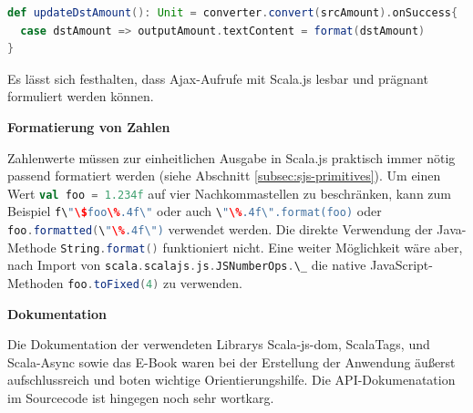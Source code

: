 \documentclass[a4paper, 12pt, hidelinks, listof=totoc, listoftables=totoc, bibliography=totoc]{scrreprt}
\newcommand{\scala}[1]{\lstinline[language=Scala, style=inline]|#1|}
\newcommand{\MyMiniSec}[1]{\rmfamily\fontsize{12}{15}\selectfont
	\vspace{7pt}\textbf{#1} %
}
\begin{document}
\begin{lstlisting}[language=Scala, style=snippet]
def updateDstAmount(): Unit = converter.convert(srcAmount).onSuccess{
  case dstAmount => outputAmount.textContent = format(dstAmount)
}
\end{lstlisting}

Es lässt sich festhalten, dass Ajax-Aufrufe mit Scala.js lesbar und prägnant formuliert werden können.


\MyMiniSec{Formatierung von Zahlen}

Zahlenwerte müssen zur einheitlichen Ausgabe in Scala.js praktisch immer nötig passend formatiert werden (siehe Abschnitt \ref{subsec:sjs-primitives}). Um einen Wert \scala{val foo = 1.234f} auf vier Nachkommastellen zu beschränken, kann zum Beispiel \scala{f\"\$foo\%.4f\"} oder auch \linebreak\mbox{\scala{\"\%.4f\".format(foo)}} oder \scala{foo.formatted(\"\%.4f\")} verwendet werden. Die direkte Verwendung der Java-Methode \scala{String.format()} funktioniert nicht. Eine weiter Möglichkeit wäre aber, nach Import von \scala{scala.scalajs.js.JSNumberOps.\_} die native JavaScript-Methoden \scala{foo.toFixed(4)} zu verwenden.


\MyMiniSec{Dokumentation}

Die Dokumentation der verwendeten Librarys Scala-js-dom, ScalaTags, und Scala-Async sowie das E-Book \cite[\#UsingWebServices]{haoyi.HOS} waren bei der Erstellung der Anwendung äußerst aufschlussreich und boten wichtige Orientierungshilfe. Die \ac{API}-Dokumenatation im Sourcecode ist hingegen noch sehr wortkarg.
\end{document}
